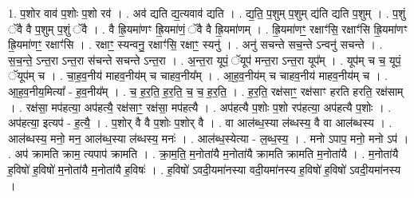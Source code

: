 \documentclass[17pt]{extarticle}
\begin{document}
1. प॒शोर वाव॑ प॒शोः प॒शो रव॑ । . अव॑ द्यति द्य॒त्यवाव॑ द्यति । . द्य॒ति॒ प॒शुम् प॒शुम् द्य॑ति द्यति प॒शुम् । . प॒शुं ॅवै वै प॒शुम् प॒शुं ॅवै । . वै ह्रि॒यमा॑णꣳ ह्रि॒यमा॑णं॒ ॅवै वै ह्रि॒यमा॑णम् । . ह्रि॒यमा॑णꣳ॒॒ रक्षाꣳ॑सि॒ रक्षाꣳ॑सि ह्रि॒यमा॑णꣳ ह्रि॒यमा॑णꣳ॒॒ रक्षाꣳ॑सि । . रक्षाꣳ॒॒ स्यन्वनु॒ रक्षाꣳ॑सि॒ रक्षाꣳ॒॒ स्यनु॑ । . अनु॑ सचन्ते सच॒न्ते ऽन्वनु॑ सचन्ते । . स॒च॒न्ते॒ ऽन्त॒रा ऽन्त॒रा स॑चन्ते सचन्ते ऽन्त॒रा । . अ॒न्त॒रा यूपं॒ ॅयूप॑ मन्त॒रा ऽन्त॒रा यूप᳚म् । . यूप॑म् च च॒ यूपं॒ ॅयूप॑म् च । . चा॒ह॒व॒नीय॑ माहव॒नीय॑म् च चाहव॒नीय᳚म् । . आ॒ह॒व॒नीय॑म् च चाहव॒नीय॑ माहव॒नीय॑म् च । . आ॒ह॒व॒नीय॒मित्या᳚ - ह॒व॒नीय᳚म् । . च॒ ह॒र॒ति॒ ह॒र॒ति॒ च॒ च॒ ह॒र॒ति॒ । . ह॒र॒ति॒ रक्ष॑साꣳ॒॒ रक्ष॑साꣳ हरति हरति॒ रक्ष॑साम् । . रक्ष॑सा॒ मप॑हत्या॒ अप॑हत्यै॒ रक्ष॑साꣳ॒॒ रक्ष॑सा॒ मप॑हत्यै । . अप॑हत्यै प॒शोः प॒शो रप॑हत्या॒ अप॑हत्यै प॒शोः । . अप॑हत्या॒ इत्यप॑ - ह॒त्यै॒ । . प॒शोर् वै वै प॒शोः प॒शोर् वै । . वा आल॑ब्ध॒स्या ल॑ब्धस्य॒ वै वा आल॑ब्धस्य । . आल॑ब्धस्य॒ मनो॒ मन॒ आल॑ब्ध॒स्या ल॑ब्धस्य॒ मनः॑ । . आल॑ब्ध॒स्येत्या - ल॒ब्ध॒स्य॒ । . मनो ऽपाप॒ मनो॒ मनो ऽप॑ । . अप॑ क्रामति क्राम॒ त्यपाप॑ क्रामति । . क्रा॒म॒ति॒ म॒नोता॑यै म॒नोता॑यै क्रामति क्रामति म॒नोता॑यै । . म॒नोता॑यै ह॒विषो॑ ह॒विषो॑ म॒नोता॑यै म॒नोता॑यै ह॒विषः॑ । . ह॒विषो॑ ऽवदी॒यमा॑नस्या वदी॒यमा॑नस्य ह॒विषो॑ ह॒विषो॑ ऽवदी॒यमा॑नस्य । \newline
\end{document}
